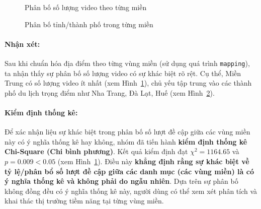 \begin{figure}[H]
    \centering
    \caption{Phân bố số lượng video theo từng miền}
    \label{fig:video_mien}
\end{figure}
\begin{figure}[H]
    \centering
    \caption{Phân bố tỉnh/thành phố trong từng miền}
    \label{fig:thanhpho_mien}
\end{figure}

\paragraph{Nhận xét:} Sau khi chuẩn hóa địa điểm theo từng vùng miền (sử dụng quá trình \texttt{mapping}), ta nhận thấy sự phân bố số lượng video có sự khác biệt rõ rệt. Cụ thể, Miền Trung có số lượng video ít nhất (xem Hình~\ref{fig:video_mien}), chủ yếu tập trung vào các thành phố du lịch trọng điểm như Nha Trang, Đà Lạt, Huế (xem Hình~\ref{fig:thanhpho_mien}).

\paragraph{Kiểm định thống kê:} Để xác nhận liệu sự khác biệt trong phân bố số lượt đề cập giữa các vùng miền này có ý nghĩa thống kê hay không, nhóm đã tiến hành \textbf{kiểm định thống kê Chi-Square (Chi bình phương)}. Kết quả kiểm định đạt $\chi^2 = 1164.65$ và $p = 0.009 < 0.05$ (xem Hình~\ref{fig:video_mien}). Điều này \textbf{khẳng định rằng sự khác biệt về tỷ lệ/phân bổ số lượt đề cập giữa các danh mục (các vùng miền) là có ý nghĩa thống kê và không phải do ngẫu nhiên}. Dựa trên sự phân bố không đồng đều có ý nghĩa thống kê này, người dùng có thể xem xét phân tích và khai thác thị trường tiềm năng tại từng vùng miền.


